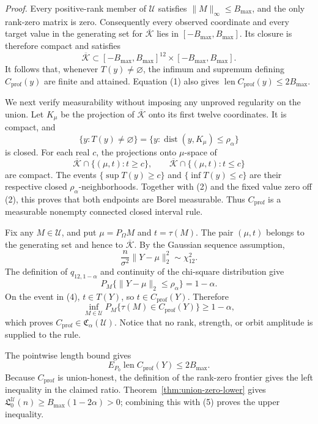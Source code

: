 \textit{Proof.}
Every positive-rank member of \(\mathcal U\) satisfies \(\lVert M\rVert_\infty\leq B_{\max}\), and the only rank-zero matrix is zero.  Consequently every observed coordinate and every target value in the generating set for \(\overline{\mathcal K}\) lies in \([-B_{\max},B_{\max}]\).  Its closure is therefore compact and satisfies
\[
 \overline{\mathcal K}\subset[-B_{\max},B_{\max}]^{12}\times[-B_{\max},B_{\max}].
\tag{1}
\]
It follows that, whenever \(T(y)\neq\varnothing\), the infimum and supremum defining \(C_{\mathrm{prof}}(y)\) are finite and attained.  Equation (1) also gives
\(\operatorname{len}C_{\mathrm{prof}}(y)\leq2B_{\max}\).

We next verify measurability without imposing any unproved regularity on the union.  Let \(K_\mu\) be the projection of \(\overline{\mathcal K}\) onto its first twelve coordinates.  It is compact, and
\[
 \{y:T(y)\neq\varnothing\}=\{y:\operatorname{dist}(y,K_\mu)\leq\rho_\alpha\}
\tag{2}
\]
is closed.  For each real \(c\), the projections onto \(\mu\)-space of
\[
 \overline{\mathcal K}\cap\{(\mu,t):t\geq c\},
 \qquad
 \overline{\mathcal K}\cap\{(\mu,t):t\leq c\}
\]
are compact.  The events \(\{\sup T(y)\geq c\}\) and \(\{\inf T(y)\leq c\}\) are their respective closed \(\rho_\alpha\)-neighborhoods.  Together with (2) and the fixed value zero off (2), this proves that both endpoints are Borel measurable.  Thus \(C_{\mathrm{prof}}\) is a measurable nonempty connected closed interval rule.

Fix any \(M\in\mathcal U\), and put \(\mu=P_\Omega M\) and \(t=\tau(M)\).  The pair \((\mu,t)\) belongs to the generating set and hence to \(\overline{\mathcal K}\).  By the Gaussian sequence assumption,
\[
 \frac{n}{\sigma^2}\lVert Y-\mu\rVert_2^2\sim\chi^2_{12}.
\tag{3}
\]
The definition of \(q_{12,1-\alpha}\) and continuity of the chi-square distribution give
\[
 P_M\{\lVert Y-\mu\rVert_2\leq\rho_\alpha\}=1-\alpha.
\tag{4}
\]
On the event in (4), \(t\in T(Y)\), so \(t\in C_{\mathrm{prof}}(Y)\).  Therefore
\[
 \inf_{M\in\mathcal U}P_M\{\tau(M)\in C_{\mathrm{prof}}(Y)\}\geq1-\alpha,
\]
which proves \(C_{\mathrm{prof}}\in\mathfrak C_\alpha(\mathcal U)\).  Notice that no rank, strength, or orbit amplitude is supplied to the rule.

The pointwise length bound gives
\[
 E_{P_0}\operatorname{len}C_{\mathrm{prof}}(Y)\leq2B_{\max}.
\tag{5}
\]
Because \(C_{\mathrm{prof}}\) is union-honest, the definition of the rank-zero frontier gives the left inequality in the claimed ratio.  Theorem~\ref{thm:union-zero-lower} gives
\(\mathfrak L_0^{\mathcal U}(n)\geq B_{\max}(1-2\alpha)>0\); combining this with (5) proves the upper inequality.

